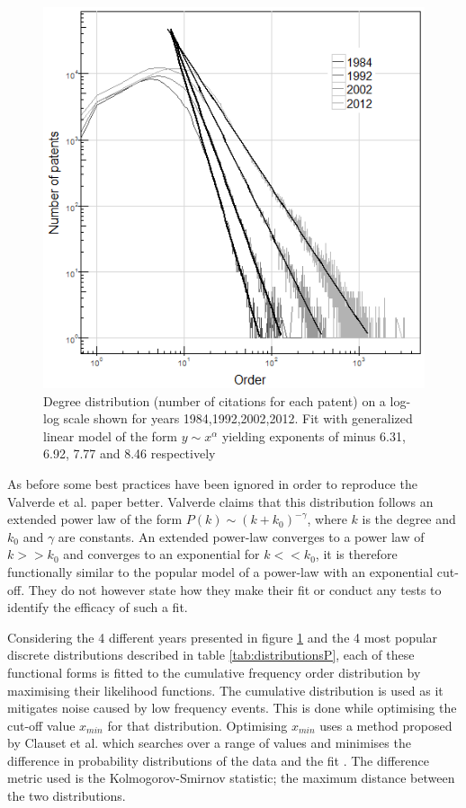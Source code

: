 \begin{figure}
\centering
  \includegraphics[width=0.7\linewidth]{Figures/OrderDistribution}
  \caption[Degree Distribution]{Degree distribution (number of citations for each patent) on a log-log scale shown for years 1984,1992,2002,2012. Fit with generalized linear model of the form $y \sim x^\alpha$ yielding exponents of minus 6.31, 6.92, 7.77 and 8.46 respectively}
\label{fig:OrderDistribution}
\end{figure}

As before some best practices have been ignored in order to reproduce the Valverde et al. paper better. Valverde claims that this distribution follows an extended power law of the form $ P(k) \sim (k + k_0)^{-\gamma} $, where $k$ is the degree and $k_0$ and $\gamma$ are constants. An extended power-law  converges to a power law of $k >> k_0$ and converges to an exponential for $ k << k_0$, it is therefore functionally similar to the popular model of a power-law with an exponential cut-off. They do not however state how they make their fit or conduct any tests to identify the efficacy of such a fit. 

Considering the 4 different years presented in figure \ref{fig:OrderDistribution} and the 4 most popular discrete distributions described in table \ref{tab:distributionsP}, each of these functional forms is fitted to the cumulative frequency order distribution by maximising their likelihood functions. The cumulative distribution is used as it mitigates noise caused by low frequency events. This is done while optimising the cut-off value $x_{min}$ for that distribution. Optimising $x_{min}$ uses a method proposed by Clauset et al. which searches over a range of values and minimises the difference in probability distributions of the data and the fit \cite{clauset2007frequency}. The difference metric used is the Kolmogorov-Smirnov statistic; the maximum distance between the two distributions. 


